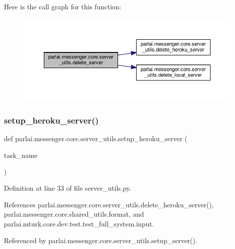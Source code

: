 Here is the call graph for this function\+:
\nopagebreak
\begin{figure}[H]
\begin{center}
\leavevmode
\includegraphics[width=350pt]{namespaceparlai_1_1messenger_1_1core_1_1server__utils_a606f5ec3e035a05cae9d1b44ff88fdde_cgraph}
\end{center}
\end{figure}
\mbox{\label{namespaceparlai_1_1messenger_1_1core_1_1server__utils_a3da4024deca88ca3c1ac20a2857b06db}} 
\subsubsection{\texorpdfstring{setup\+\_\+heroku\+\_\+server()}{setup\_heroku\_server()}}
{\footnotesize\ttfamily def parlai.\+messenger.\+core.\+server\+\_\+utils.\+setup\+\_\+heroku\+\_\+server (\begin{DoxyParamCaption}\item[{}]{task\+\_\+name }\end{DoxyParamCaption})}



Definition at line 33 of file server\+\_\+utils.\+py.



References parlai.\+messenger.\+core.\+server\+\_\+utils.\+delete\+\_\+heroku\+\_\+server(), parlai.\+messenger.\+core.\+shared\+\_\+utils.\+format, and parlai.\+mturk.\+core.\+dev.\+test.\+test\+\_\+full\+\_\+system.\+input.



Referenced by parlai.\+messenger.\+core.\+server\+\_\+utils.\+setup\+\_\+server().

